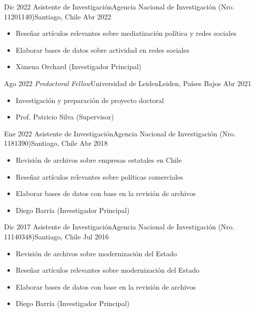 \begin{experiences}
  \emptySeparator 
  \experience 
    {Dic 2022} {Asistente de Investigación}{Agencia Nacional de Investigación (Nro. 11201140)}{Santiago, Chile} {Abr 2022}
    {\begin{itemize}
    \item Reseñar artículos relevantes sobre mediatización política y redes sociales
    \item Elaborar bases de datos sobre actividad en redes sociales
    \item Ximena Orchard {\small (Investigador Principal)}
    \end{itemize}}
    {}
\end{experiences}
\vspace{-2mm}

\begin{experiences}
  \emptySeparator 
  \experience 
    {Ago 2022} {\itshape Predoctoral Fellow}{Universidad de Leiden}{Leiden, Países Bajos} {Abr 2021}
    {\begin{itemize}
    \item Investigación y preparación de proyecto doctoral
    \item Prof. Patricio Silva {\small (Supervisor)}
    \end{itemize}}
    {}
\end{experiences}
\vspace{-2mm}

\begin{experiences}
  \emptySeparator 
  \experience 
    {Ene 2022} {Asistente de Investigación}{Agencia Nacional de Investigación (Nro. 1181390)}{Santiago, Chile} {Abr 2018}
    {\begin{itemize}
    \item Revisión de archivos sobre empresas estatales en Chile
    \item Reseñar artículos relevantes sobre políticas comerciales
    \item Elaborar bases de datos con base en la revisión de archivos
    \item Diego Barría {\small (Investigador Principal)}
    \end{itemize}}
    {}
\end{experiences}
\vspace{-2mm}

\begin{experiences}
  \emptySeparator 
  \experience 
    {Dic 2017} {Asistente de Investigación}{Agencia Nacional de Investigación (Nro. 11140348)}{Santiago, Chile} {Jul 2016}
    {\begin{itemize}
    \item Revisión de archivos sobre modernización del Estado
    \item Reseñar artículos relevantes sobre modernización del Estado
    \item Elaborar bases de datos con base en la revisión de archivos
    \item Diego Barría {\small (Investigador Principal)}
    \end{itemize}}
    {}
\end{experiences}
\vspace{-2mm}

